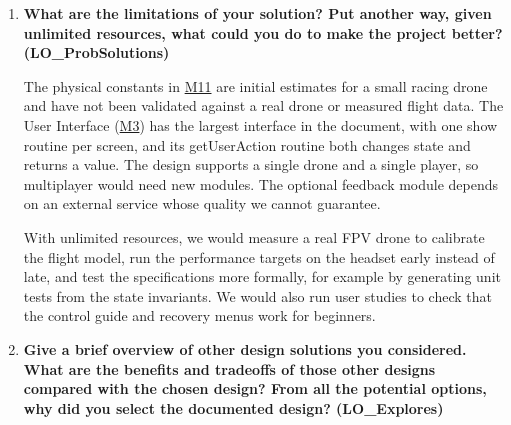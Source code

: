 \documentclass[12pt, titlepage]{article}
\newcommand{\Mref}[1]{\hyperref[sec:M#1]{M#1}}
\begin{document}
\begin{enumerate}
  Writing the MIS exposed gaps in the MG. Its anticipated changes did not
  cover every likely change in the SRS, so we linked each one to the SRS
  likely changes and added two more for the crash rule and the result
  synchronization policy. Its communication protocols section said the game
  runs only on the headset, which contradicted the PCVR requirement that the
  MIS specifies, so that section was corrected. A few rows of its requirements
  traceability table also named modules that the MIS showed were not involved,
  and these were fixed. Two references in our shared bibliography pointed to
  PDF locations that did not exist and were corrected. The module names used
  in the test traceability of the VnV Plan predate the final fifteen modules
  and still need to be updated to match.

  \item \textbf{What are the limitations of your solution?  Put another way,
  given unlimited resources, what could you do to make the project better?
  (LO\_ProbSolutions)}

  The physical constants in \Mref{11} are initial estimates for a small racing
  drone and have not been validated against a real drone or measured flight
  data. The User Interface (\Mref{3}) has the largest interface in the
  document, with one show routine per screen, and its getUserAction routine
  both changes state and returns a value. The design supports a single drone
  and a single player, so multiplayer would need new modules. The optional
  feedback module depends on an external service whose quality we cannot
  guarantee.

  With unlimited resources, we would measure a real FPV drone to calibrate the
  flight model, run the performance targets on the headset early instead of
  late, and test the specifications more formally, for example by generating
  unit tests from the state invariants. We would also run user studies to
  check that the control guide and recovery menus work for beginners.

  \item \textbf{Give a brief overview of other design solutions you
  considered.  What are the benefits and tradeoffs of those other designs
  compared with the chosen design?  From all the potential options, why did
  you select the documented design? (LO\_Explores)}


\end{enumerate}
\end{document}
